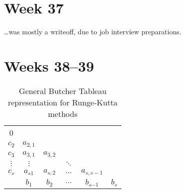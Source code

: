 \section{Week 37}
\label{sec:37}

\ldots was mostly a writeoff, due to job interview preparations.

\section{Weeks 38--39}

\begin{table}[h]
    \caption{General Butcher Tableau representation for Runge-Kutta methods}
    \label{tab:general_butcher_tableau}
    \centering
    \begin{tabular}{c|ccccc}
        0 \\
        $c_{\scriptscriptstyle 2}$ & $a_{\scriptscriptstyle 2,1}$ \\
        $c_{\scriptscriptstyle 3}$ & $a_{\scriptscriptstyle 3,1}$ & $a_{\scriptscriptstyle 3,2}$ \\
        $\vdots$ & $\vdots$ & & $\ddots$ \\
        $c_{s}$ & $a_{s1}$ & $a_{s, \scriptscriptstyle 2}$ & $\ldots$ & $a_{s,s \scriptscriptstyle -1}$ \\
        \hline
        & $b_{\scriptscriptstyle 1}$ & $b_{\scriptscriptstyle 2}$ & $\ldots$ & $b_{s \scriptscriptstyle{-1}}$ & $b_{s}$
    \end{tabular}
\end{table}


